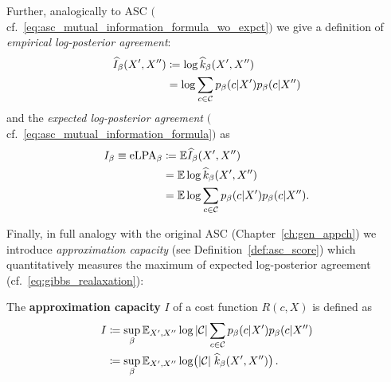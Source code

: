 \begin{definition}\label{def:free_log_posteriors}
Further, analogically to ASC
$($cf.~\eqref{eq:asc_mutual_information_formula_wo_expct}$)$ we give a definition of
\textit{empirical log-posterior agreement}:
\begin{align}
  \widehat I_\beta(X', X'') &\coloneqq \log \widehat{k}_\beta(X', X'') \notag \\
    &=  \log \sum_{c \in {\cal C}} p_\beta(c | X') p_\beta(c | X'')
\end{align}
%
and the \textit{expected log-posterior agreement}
$($cf.~\eqref{eq:asc_mutual_information_formula}$)$ as
\begin{align}
  I_\beta \equiv \mathrm{eLPA}_\beta &\coloneqq \mathbb{E} \widehat I_\beta(X', X'') \notag \\ 
    &= \mathbb{E} \log \widehat{k}_\beta(X', X'') \notag \\
    &= \mathbb{E} \log \sum_{c \in {\cal C}} p_\beta(c | X') p_\beta(c
  | X'').
\end{align}
%
%
\end{definition}

Finally, in full analogy with the original ASC (Chapter~\ref{ch:gen_appch}) we
introduce \textit{approximation capacity} (see Definition~\ref{def:asc_score})
which quantitatively measures the maximum of expected log-posterior agreement
(cf.~\eqref{eq:gibbs_realaxation}):
\begin{definition}\label{def:gencapacity}
The \textbf{approximation capacity} $I$ of a cost function $R(c,X)$
is defined as
\begin{align}\label{eq:gencapacity}
  I 
    &\coloneqq \sup_\beta \mathbb{E}_{X', X''} 
      \log |{\cal C}| \sum_{c \in {\cal C}} p_\beta(c | X') p_\beta(c | X'') \notag \\
    &\coloneqq \sup_\beta \mathbb{E}_{X', X''} \log\bigl(|{\cal C}|\;
    \widehat{k}_\beta(X', X'') \bigr)\,.
\end{align}
\end{definition}

